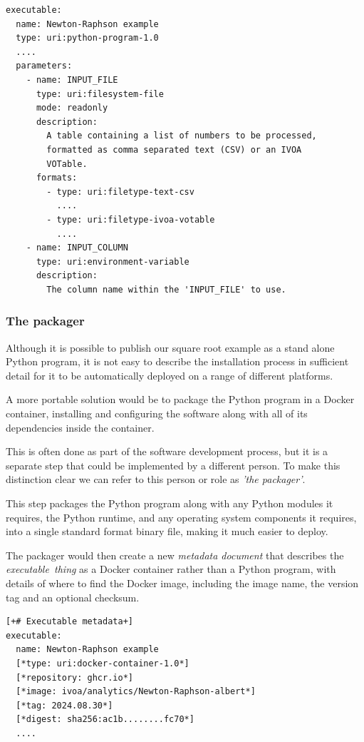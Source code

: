 \documentclass[11pt,a4paper]{ivoa}
\newcommand{\executablething}[1] {\textit{executable~thing#1}}
\newcommand{\metadoc} [1]{\textit{metadata document#1}}
\newcommand{\python} {Python}
\newcommand{\pythonprogram} {Python program}
\newcommand{\pythonruntime} {Python runtime}
\newcommand{\dockerimage} {Docker image}
\newcommand{\dockercontainer} {Docker container}
\begin{document}
\begin{lstlisting}[]
executable:
  name: Newton-Raphson example
  type: uri:python-program-1.0
  ....
  parameters:
    - name: INPUT_FILE
      type: uri:filesystem-file
      mode: readonly
      description:
        A table containing a list of numbers to be processed,
        formatted as comma separated text (CSV) or an IVOA
        VOTable.
      formats:
        - type: uri:filetype-text-csv
          ....
        - type: uri:filetype-ivoa-votable
          ....
    - name: INPUT_COLUMN
      type: uri:environment-variable
      description:
        The column name within the 'INPUT_FILE' to use.
\end{lstlisting}

\subsubsection{The packager}
\label{subsub-software-packager}

Although it is possible to publish our square root example as a stand alone \pythonprogram{},
it is not easy to describe the installation process in sufficient detail for it to be
automatically deployed on a range of different platforms.

A more portable solution would be to package the \pythonprogram{} in a \dockercontainer{},
installing and configuring the software along with all of its dependencies inside the container.

This is often done as part of the software development process, but it is a separate
step that could be implemented by a different person.
To make this distinction clear we can refer to this person or role as \textit{'the packager'}.

This step packages the \pythonprogram{} along with any \python{} modules it requires,
the \pythonruntime{}, and any operating system components it requires, into a single
standard format binary file, making it much easier to deploy.

The packager would then create a new \metadoc{} that describes the \executablething{}
as a \dockercontainer{} rather than a \pythonprogram{}, with details of where to
find the \dockerimage{}, including the image name, the version tag and an optional
checksum.

\begin{lstlisting}[]
[+# Executable metadata+]
executable:
  name: Newton-Raphson example
  [*type: uri:docker-container-1.0*]
  [*repository: ghcr.io*]
  [*image: ivoa/analytics/Newton-Raphson-albert*]
  [*tag: 2024.08.30*]
  [*digest: sha256:ac1b........fc70*]
  ....
\end{lstlisting}
\end{document}
